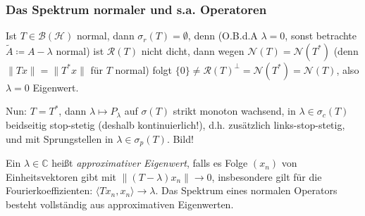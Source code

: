 \documentclass[11pt,a4paper]{scrartcl}
\newcommand{\C}{\mathbb{C}} %
\newcommand{\Hc}{\mathcal{H}}
\newcommand{\B}{\mathcal{B}}
\newcommand{\Nc}{\mathcal{N}}
\newcommand{\Rc}{\mathcal{R}}
\theoremstyle{plain}
\theoremstyle{definition}
\theoremstyle{remark}
\begin{document}
\subsubsection{Das Spektrum normaler und s.a. Operatoren}

Ist $T\in \B(\Hc)$ normal, dann $\sigma_r(T)=\emptyset$, denn (O.B.d.A $\lambda=0$, sonst betrachte $\tilde A \coloneqq A-\lambda$ normal) ist $\Rc(T)$ nicht dicht, dann wegen $\Nc(T)=\Nc(T^*)$ (denn $\|Tx\|=\|T^*x\|$ für $T$ normal) folgt $\{0\} \neq \Rc(T)^\bot = \Nc(T^*) = \Nc(T)$, also $\lambda=0$ Eigenwert.

Nun: $T=T^*$, dann $\lambda \mapsto P_\lambda$ auf $\sigma(T)$ strikt monoton wachsend, in $\lambda \in \sigma_c(T)$ beidseitig stop-stetig (deshalb kontinuierlich!), d.h. zusätzlich links-stop-stetig,  und mit Sprungstellen in $\lambda \in \sigma_p(T)$. Bild!

Ein $\lambda\in \C$ heißt \emph{approximativer Eigenwert}, falls es Folge $(x_n)$ von Einheitsvektoren gibt mit $\|(T-\lambda)x_n\| \to 0$, insbesondere gilt für die Fourierkoeffizienten: $\langle Tx_n, x_n \rangle \to \lambda$. Das Spektrum eines normalen Operators besteht vollständig aus approximativen Eigenwerten.
\end{document}
